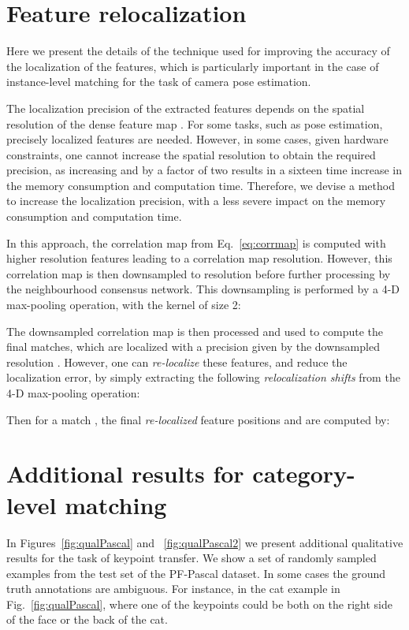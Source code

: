 \documentclass{article}
\begin{document}
\section{Feature relocalization \label{apx:feature_reloc}}
Here we present the details of the technique used for improving the accuracy of the localization of the features, which is particularly important in the case of instance-level matching for the task of camera pose estimation.

The localization precision of the extracted features  depends on the spatial resolution  of the dense feature map . For some tasks, such as pose estimation, precisely localized features are needed. However, in some cases, given hardware constraints, one cannot increase the spatial resolution  to obtain the required precision, as increasing  and  by a factor of two results in a sixteen time increase in the memory consumption and computation time. Therefore, we devise a method to increase the localization precision, with a less severe impact on the memory consumption and computation time.

In this approach, the correlation map  from Eq.~\eqref{eq:corrmap} is computed with higher resolution features  leading to a  correlation map resolution. However, this correlation map  is then downsampled to resolution  before further processing by the neighbourhood consensus network. This downsampling is performed by a 4-D max-pooling operation, with the kernel of size 2:



The downsampled correlation map  is then processed and used to compute the final matches, which are localized with a precision given by the downsampled resolution .
However, one can \emph{re-localize} these features, and reduce the localization error, by simply extracting the following \emph{relocalization shifts} from the 4-D max-pooling operation:



Then for a match , the final \emph{re-localized} feature positions  and  are computed by:




\section{Additional results for category-level matching\label{apx:cat_level}}
In Figures~\ref{fig:qualPascal} and ~\ref{fig:qualPascal2} we present additional qualitative results for the task of keypoint transfer. We show a set of randomly sampled examples from the test set of the PF-Pascal dataset. In some cases the ground truth annotations are ambiguous. For instance, in the cat example in Fig.~\ref{fig:qualPascal}, where one of the keypoints could be both on the right side of the face or the back of the cat.
\end{document}
